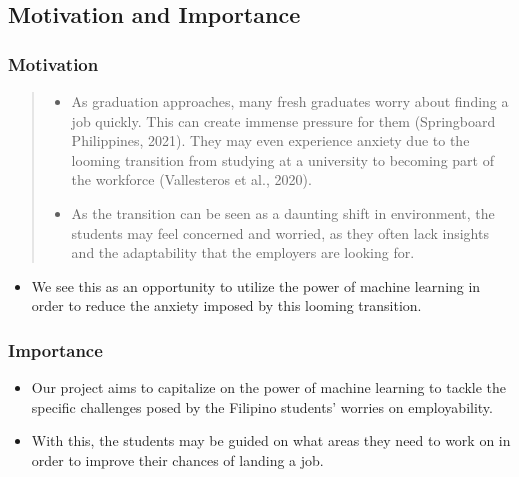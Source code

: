 \subsection{Motivation and Importance}
\begin{frame}
\frametitle{Motivation}
	\begin{quote}
		\begin{itemize}
			\item As graduation approaches, many fresh graduates worry about finding a job quickly. This can create immense pressure for them (Springboard Philippines, 2021). They may even experience anxiety due to the looming transition from studying at a university to becoming part of the workforce (Vallesteros et al., 2020).
			\item As the transition can be seen as a daunting shift in environment, the students may feel concerned and worried, as they often lack insights and the adaptability that the employers are looking for.
		\end{itemize}
	\end{quote}
	\begin{itemize}
		\item We see this as an opportunity to utilize the power of machine learning in order to reduce the anxiety imposed by this looming transition.
	\end{itemize}
\end{frame}

\begin{frame}
\frametitle{Importance}
	\begin{itemize}
		\item Our project aims to capitalize on the power of machine learning to tackle the specific challenges posed by the Filipino students’ worries on employability.
		\item With this, the students may be guided on what areas they need to work on in order to improve their chances of landing a job.
	\end{itemize}
\end{frame}
